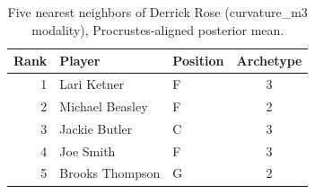 \begin{table}[htbp]
  \centering\small
  \begin{tabular}{rllc}
    \toprule
    Rank & Player & Position & Archetype \\
    \midrule
    1 & Lari Ketner & F & 3 \\
    2 & Michael Beasley & F & 2 \\
    3 & Jackie Butler & C & 3 \\
    4 & Joe Smith & F & 3 \\
    5 & Brooks Thompson & G & 2 \\
    \bottomrule
  \end{tabular}
  \caption{Five nearest neighbors of Derrick Rose (curvature_m3 modality), Procrustes-aligned posterior mean.}
  \label{tab:Derrick_Rose_neighbors_curvature_m3}
\end{table}

